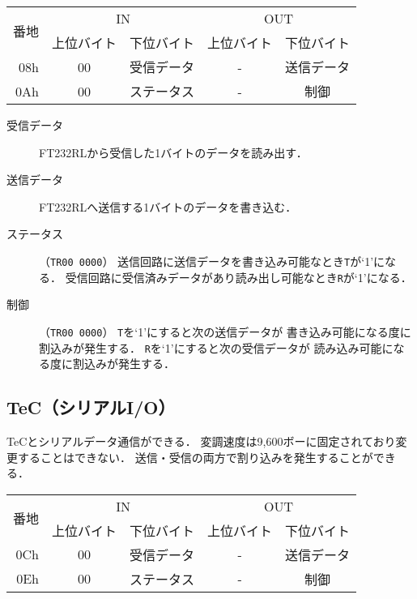 \begin{center}
  \small\begin{tabular}{| r | c | c || c | c |}\hline
    \multirow{2}{*}{番地}
    & \multicolumn{2}{|c||}{IN}
    & \multicolumn{2}{c|}{OUT}
    \\\cline{2-5}
         & 上位バイト & 下位バイト & 上位バイト & 下位バイト
    \\\hline\hline
    08h  &  00 & 受信データ
         &  -  & 送信データ \\\hline
    0Ah  &  00 & ステータス
         &  -  & 制御 \\\hline
  \end{tabular}
\end{center}

\begin{description}
\item[受信データ]
  FT232RLから受信した1バイトのデータを読み出す．
\item[送信データ]
  FT232RLへ送信する1バイトのデータを書き込む．
\item[ステータス]（\texttt{TR00 0000}）
  送信回路に送信データを書き込み可能なとき\texttt{T}が`1'になる．
  受信回路に受信済みデータがあり読み出し可能なとき\texttt{R}が`1'になる．
\item[制御]（\texttt{TR00 0000}）
  \texttt{T}を`1'にすると次の送信データが
  書き込み可能になる度に割込みが発生する．
  \texttt{R}を`1'にすると次の受信データが
  読み込み可能になる度に割込みが発生する．
\end{description}

\subsection{TeC（シリアルI/O）}
TeCとシリアルデータ通信ができる．
変調速度は9,600ボーに固定されており変更することはできない．
送信・受信の両方で割り込みを発生することができる．

\begin{center}
  \small\begin{tabular}{| r | c | c || c | c |}\hline
    \multirow{2}{*}{番地}
    & \multicolumn{2}{|c||}{IN}
    & \multicolumn{2}{c|}{OUT}
    \\\cline{2-5}
         & 上位バイト & 下位バイト & 上位バイト & 下位バイト
    \\\hline\hline
    0Ch  &  00 & 受信データ
         &  -  & 送信データ \\\hline
    0Eh  &  00 & ステータス
         &  -  & 制御 \\\hline
  \end{tabular}
\end{center}

